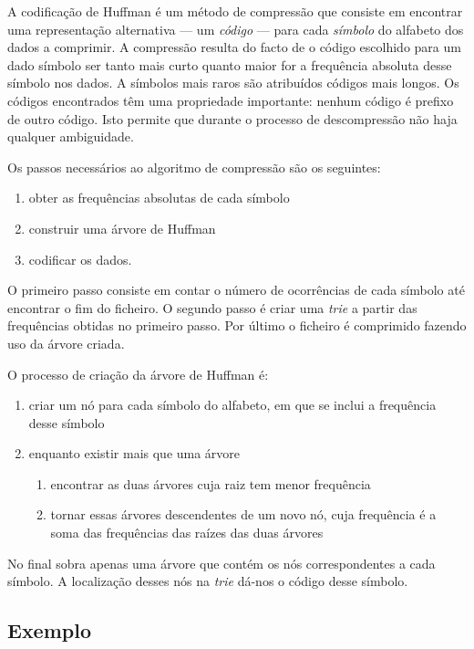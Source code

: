 A codificação de Huffman é um método de compressão que consiste em encontrar uma representação alternativa --- um \emph{código} --- para cada \emph{símbolo} do alfabeto dos dados a comprimir. A compressão resulta do facto de o código escolhido para um dado símbolo ser tanto mais curto quanto maior for a frequência absoluta desse símbolo nos dados. A símbolos mais raros são atribuídos códigos mais longos. Os códigos encontrados têm uma propriedade importante: nenhum código é prefixo de outro código. Isto permite que durante o processo de descompressão não haja qualquer ambiguidade.

Os passos necessários ao algoritmo de compressão são os seguintes:

\begin{enumerate}
  \item obter as frequências absolutas de cada símbolo
  \item construir uma árvore de Huffman
  \item codificar os dados.
\end{enumerate}

O primeiro passo consiste em contar o número de ocorrências de cada símbolo até encontrar o fim do ficheiro. O segundo passo é criar uma \emph{trie} a partir das frequências obtidas no primeiro passo. Por último o ficheiro é comprimido fazendo uso da árvore criada.

O processo de criação da árvore de Huffman é:

\begin{enumerate}
  \item criar um nó para cada símbolo do alfabeto, em que se inclui a frequência desse símbolo
  \item enquanto existir mais que uma árvore
    \begin{enumerate}
    \item encontrar as duas árvores cuja raiz tem menor frequência
    \item tornar essas árvores descendentes de um novo nó, cuja frequência é a soma das frequências das raízes das duas árvores
  \end{enumerate}
\end{enumerate}

No final sobra apenas uma árvore que contém os nós correspondentes a cada símbolo. A localização desses nós na \textit{trie} dá-nos o código desse símbolo.

\subsection{Exemplo}

